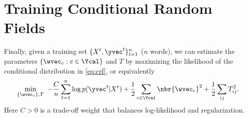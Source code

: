 \documentclass[11pt]{report}
\begin{document}
\section{Training Conditional Random Fields}

Finally, given a training set $\{X^t, \yvec^t\}_{t=1}^n$ ($n$ words),
we can estimate the parameters $\{\wvec_c : c \in \Ycal\}$ and $T$ by maximizing the likelihood of the conditional distribution in \eqref{eq:crf}, or equivalently
\begin{align}
	\label{eq:obj_MLE}
	\min_{\{\wvec_c\}, T} \ -\frac{C}{n}\sum_{t=1}^n \log p(\yvec^t | X^t) 
	+ \frac{1}{2} \sum_{c \in \Ycal} \nbr{\wvec_c}^2 
	+ \frac{1}{2} \sum_{ij} T^2_{ij}.
\end{align}
Here $C > 0$ is a trade-off weight that balances log-likelihood and regularization.
\end{document}
